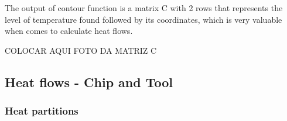 	
	

	The output of contour function is a matrix C with 2 rows that represents the level of temperature found followed by its coordinates, which is very valuable when comes to calculate heat flows.

	COLOCAR AQUI FOTO DA MATRIZ C

	\subsection{Heat flows - Chip and Tool}

		\subsubsection{Heat partitions}

	
	
